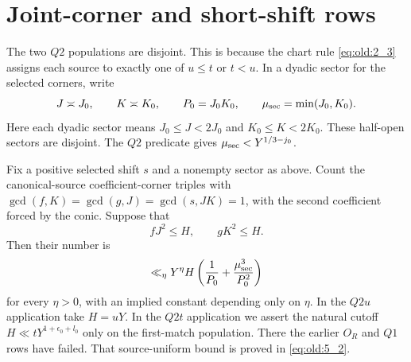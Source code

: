 \section{Joint-corner and short-shift rows}\label{sec:joint}

The two \(Q2\) populations are disjoint. This is because the chart rule
\eqref{eq:old:2_3} assigns each source to exactly one of \(u\le t\) or
\(t<u\). In a dyadic sector for the selected corners, write
\[
J\asymp J_0,\qquad K\asymp K_0,\qquad
 P_0=J_0K_0,\qquad \mu_{\rm sec}=\min(J_0,K_0).
\]
Here each dyadic sector means \(J_0\le J<2J_0\) and
\(K_0\le K<2K_0\). These half-open sectors are disjoint. The \(Q2\) predicate gives
\(\mu_{\rm sec}<Y^{1/3-j_0}\).

\begin{lemma}\label{lem:q2-sector}
Fix a positive selected shift \(s\) and a nonempty sector as above. Count
the canonical-source coefficient-corner triples with
\(\gcd(f,K)=\gcd(g,J)=\gcd(s,JK)=1\), with the second coefficient
forced by the conic. Suppose that
\[
fJ^2\le H,\qquad gK^2\le H.
\]
Then their number is
\[
\ll_\eta Y^\eta H\left(\frac1{P_0}+\frac{\mu_{\rm sec}^3}{P_0^2}\right)
\]
for every \(\eta>0\), with an implied constant depending only on \(\eta\).
In the \(Q2u\) application take \(H=uY\). In the \(Q2t\) application
we assert the natural cutoff \(H\ll tY^{1+\epsilon_0+l_0}\) only on
the first-match population. There the earlier \(O_R\) and \(Q1\) rows
have failed. That source-uniform bound is proved in \eqref{eq:old:5_2}.
\end{lemma}

